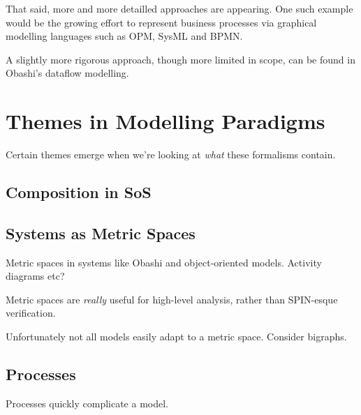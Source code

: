 That said, more and more detailled approaches are appearing. One such example would be the growing effort to represent business processes via graphical modelling languages such as OPM, SysML and BPMN.
\par

A slightly more rigorous approach, though more limited in scope, can be found in Obashi's dataflow modelling.
\par


\section{Themes in Modelling Paradigms}
Certain themes emerge when we're looking at \emph{what} these formalisms contain.


\subsection{Composition in SoS}


\subsection{Systems as Metric Spaces}
Metric spaces in systems like Obashi and object-oriented models. Activity diagrams etc?
\par

Metric spaces are \emph{really} useful for high-level analysis, rather than SPIN-esque verification.
\par

Unfortunately not all models easily adapt to a metric space. Consider bigraphs.
\par

\subsection{Processes}
Processes quickly complicate a model.


